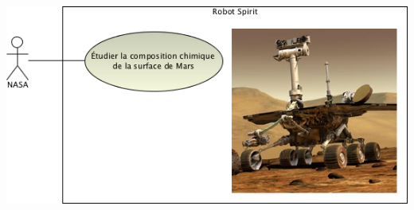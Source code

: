 \documentclass[10pt,fleqn]{article} %
\begin{document}
\def\pathfig{images}

\vspace{4.5cm}
\pagestyle{fancy}
\thispagestyle{plain}

\def\columnseprulecolor{\color{ocre}}
\setlength{\columnseprule}{0.4pt} 

\def\pathfig{images}


\ifprof
\begin{multicols}{2}
\else
\begin{multicols}{2}
\fi


\begin{center}
\includegraphics[width=.8\linewidth]{images/fig_01.png}
\end{center}



\end{multicols}
\end{multicols}
\end{document}
